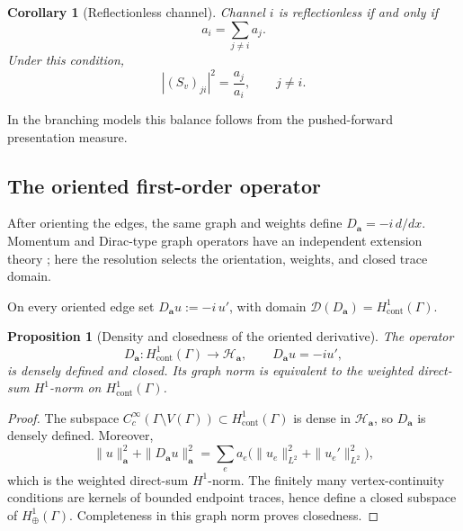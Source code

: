 \documentclass[11pt]{article}
\theoremstyle{plain}
\newtheorem{proposition}[theorem]{Proposition}
\newtheorem{corollary}[theorem]{Corollary}
\theoremstyle{definition}
\begin{document}
\begin{corollary}[Reflectionless channel]
\label{cor:reflectionless-channel}
Channel \(i\) is reflectionless if and only if
\[
  a_i
  =
  \sum_{j\neq i}a_j.
\]
Under this condition,
\[
  |(S_v)_{ji}|^2
  =
  \frac{a_j}{a_i},
  \qquad
  j\neq i.
\]
\end{corollary}

In the branching models this balance follows from the pushed-forward presentation measure.

\subsection{The oriented first-order operator}
\label{subsec:scalar-first-order-framework}

After orienting the edges, the same graph and weights define \(D_{\mathbf a}=-i\,d/dx\). Momentum and Dirac-type graph operators have an independent extension theory \citep{FullingKuchmentWilson07,Post09,ExnerMomentum13,Richtsfeld24}; here the resolution selects the orientation, weights, and closed trace domain.

On every oriented edge set
\(D_{\mathbf a}u := -i\,u'\),
with domain
\(\mathcal D(D_{\mathbf a}) = H^1_{\mathrm{cont}}(\Gamma)\).

\begin{proposition}[Density and closedness of the oriented derivative]
\label{prop:first-order-closed-dense}
The operator
\[
  D_{\mathbf a}:
  H^1_{\mathrm{cont}}(\Gamma)
  \longrightarrow
  \mathcal H_{\mathbf a},
  \qquad
  D_{\mathbf a}u=-iu',
\]
is densely defined and closed. Its graph norm is equivalent to the weighted
direct-sum \(H^1\)-norm on \(H^1_{\mathrm{cont}}(\Gamma)\).
\end{proposition}

\begin{proof}
The subspace \(C_c^\infty(\Gamma\setminus V(\Gamma))\subset H^1_{\mathrm{cont}}(\Gamma)\) is dense in \(\mathcal H_{\mathbf a}\), so \(D_{\mathbf a}\) is densely defined. Moreover,
\[
 \|u\|_{\mathbf a}^2+\|D_{\mathbf a}u\|_{\mathbf a}^2
 =\sum_e a_e\bigl(\|u_e\|_{L^2}^2+\|u_e'\|_{L^2}^2\bigr),
\]
which is the weighted direct-sum \(H^1\)-norm. The finitely many vertex-continuity conditions are kernels of bounded endpoint traces, hence define a closed subspace of \(H_\oplus^1(\Gamma)\). Completeness in this graph norm proves closedness.
\end{proof}
\end{document}
